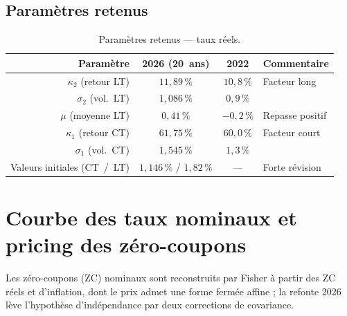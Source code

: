 \documentclass[11pt,a4paper]{article}
\newcommand{\tablehead}[1]{{\sffamily\bfseries\color{nxnavy}#1}}
\begin{document}
\subsection{Paramètres retenus}
\begin{table}[H]
\centering\small
\renewcommand{\arraystretch}{1.4}\setlength{\tabcolsep}{6pt}
\begin{tabularx}{\linewidth}{R c c >{\raggedright\arraybackslash}p{3.6cm}}
\toprule
\tablehead{Paramètre} & \tablehead{2026 (20~ans)} & \tablehead{2022} & \tablehead{Commentaire} \\
\midrule
{} $\kappa_2$ (retour LT) & $11{,}89\,\%$ & $10{,}8\,\%$ & Facteur long \\
$\sigma_2$ (vol.\ LT) & $1{,}086\,\%$ & $0{,}9\,\%$ & \\
 $\mu$ (moyenne LT) & $0{,}41\,\%$ & $-0{,}2\,\%$ & Repasse positif \\
$\kappa_1$ (retour CT) & $61{,}75\,\%$ & $60{,}0\,\%$ & Facteur court \\
 $\sigma_1$ (vol.\ CT) & $1{,}545\,\%$ & $1{,}3\,\%$ & \\
Valeurs initiales (CT~/~LT) & $1{,}146\,\%$ / $1{,}82\,\%$ & --- & Forte révision \\
\bottomrule
\end{tabularx}
\caption{Paramètres retenus --- taux réels.}
\end{table}

\clearpage
\section{Courbe des taux nominaux et pricing des zéro-coupons}
\label{sec:zc}
Les zéro-coupons (ZC) nominaux sont reconstruits par Fisher à partir des ZC réels et d'inflation, dont le prix admet une forme fermée affine ; la refonte 2026 lève l'hypothèse d'indépendance par deux corrections de covariance.
\end{document}
